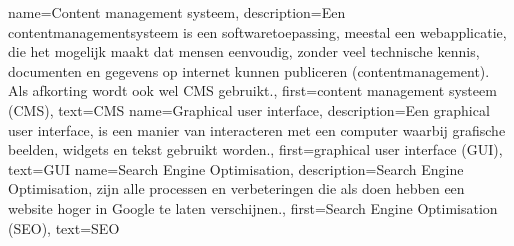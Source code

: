 \makenoidxglossaries

{
    name={Content management systeem},
    description={Een contentmanagementsysteem is een softwaretoepassing,
        meestal een webapplicatie, die het mogelijk maakt dat mensen eenvoudig, zonder veel technische kennis,
        documenten en gegevens op internet kunnen publiceren (contentmanagement).
    Als afkorting wordt ook wel CMS gebruikt.},
    first={content management systeem (CMS)},
    text={CMS}
}
{
    name={Graphical user interface},
    description={Een graphical user interface, is een manier van interacteren met een computer waarbij grafische beelden, widgets en tekst gebruikt worden.},
    first={graphical user interface (GUI)},
    text={GUI}
}
{
    name={Search Engine Optimisation},
    description={Search Engine Optimisation, zijn alle processen en verbeteringen die als doen hebben een website hoger in Google te laten verschijnen.},
    first={Search Engine Optimisation (SEO)},
    text={SEO}
}
